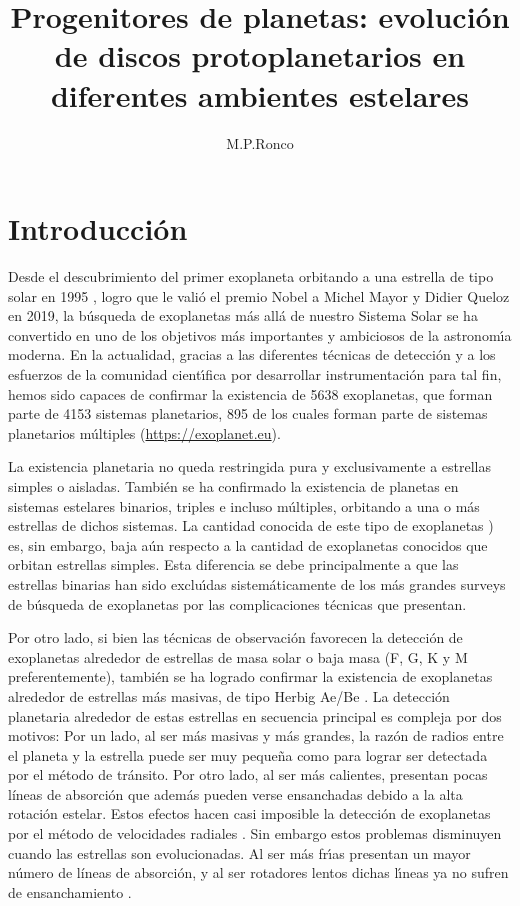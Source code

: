 \documentclass[baaa]{baaa}
\title{Progenitores de planetas: evoluci\'on de discos protoplanetarios en diferentes ambientes estelares }
\author{
M.P.Ronco\inst{1}
}
\institute{
Instituto de Astrof\'{\i}sica de La Plata, CONICET--UNLP, Argentina}
\begin{document}
\maketitle
\section{Introducci\'on}\label{S_intro}

Desde el descubrimiento del primer exoplaneta orbitando a una estrella de tipo solar en 1995 \citep{Mayor1995}, logro que le valió el premio Nobel a Michel Mayor y Didier Queloz en 2019, la b\'usqueda de exoplanetas más all\'a de nuestro Sistema Solar se ha convertido en uno de los objetivos m\'as importantes y ambiciosos de la astronom\'{\i}a moderna. En la actualidad, gracias a las diferentes t\'ecnicas de detecci\'on y a los esfuerzos de la comunidad cient\'{\i}fica por desarrollar instrumentaci\'on para tal fin, hemos sido capaces de confirmar la existencia de 5638 exoplanetas, que forman parte de 4153 sistemas planetarios, 895 de los cuales forman parte de sistemas planetarios m\'ultiples (\url{https://exoplanet.eu}).

La existencia planetaria no queda restringida pura y exclusivamente a estrellas simples o aisladas. Tambi\'en se ha confirmado la existencia de planetas en sistemas estelares binarios, triples e incluso m\'ultiples, orbitando a una o m\'as estrellas de dichos sistemas. La cantidad conocida de este tipo de exoplanetas \citep[unos 217 ejemplares, ver][]{Schwarz2016}) es, sin embargo, baja a\'un respecto a la cantidad de exoplanetas conocidos que orbitan estrellas simples. Esta diferencia se debe principalmente a que las estrellas binarias han sido exclu\'{\i}das sistem\'aticamente de los m\'as grandes surveys de b\'usqueda de exoplanetas por las complicaciones t\'ecnicas que presentan. 

Por otro lado, si bien las t\'ecnicas de observaci\'on favorecen la detecci\'on de exoplanetas alrededor de estrellas de masa solar o baja masa (F, G, K y M preferentemente), tambi\'en se ha logrado confirmar la existencia de exoplanetas alrededor de estrellas m\'as masivas, de tipo Herbig Ae/Be \citep{Borgniet2019,Berger2020,Wagner2022}. La detecci\'on planetaria alrededor de estas estrellas en secuencia principal es compleja por dos motivos: Por un lado, al ser m\'as masivas y m\'as grandes, la raz\'on de radios entre el planeta y la estrella puede ser muy peque\~na como para lograr ser detectada por el m\'etodo de tr\'ansito. Por otro lado, al ser m\'as calientes, presentan pocas l\'ineas de absorci\'on que adem\'as pueden verse ensanchadas debido a la alta rotaci\'on estelar. Estos efectos hacen casi imposible la detecci\'on de exoplanetas por el m\'etodo de velocidades radiales \citep{Lagrange2009}. Sin embargo estos problemas disminuyen cuando las estrellas son evolucionadas. Al ser m\'as fr\'{\i}as presentan un mayor n\'umero de l\'ineas de absorci\'on, y al ser rotadores lentos dichas l\'{\i}neas ya no sufren de ensanchamiento \citep{Johnson2008}.
\end{document}
